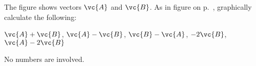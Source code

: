  The figure shows vectors $\vc{A}$ and $\vc{B}$. As in figure  on p.~\pageref{fig:tip-to-tail}, graphically
calculate the following:

         $\vc{A}+\vc{B}$,  $\vc{A}-\vc{B}$,  $\vc{B}-\vc{A}$,  $-2\vc{B}$,  $\vc{A}-2\vc{B}$

\noindent No numbers are involved.
